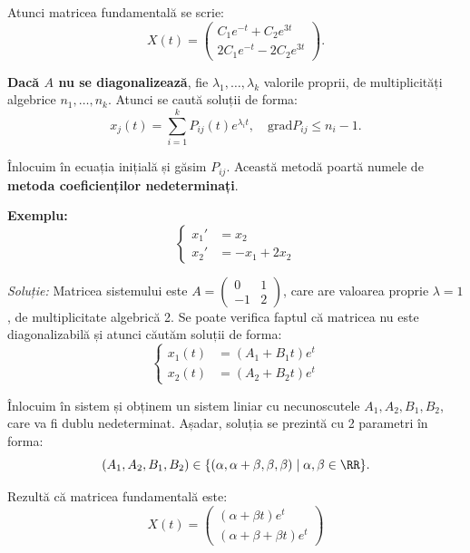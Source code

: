 Atunci matricea fundamentală se scrie:
\[
  X(t) = \begin{pmatrix}
    C_1 e^{-t} + C_2 e^{3t} \\
    2C_1 e^{-t} - 2C_2 e^{3t}
  \end{pmatrix}.
\]

\vspace{0.5cm}

\textbf{Dacă $A$ nu se diagonalizează}, fie $\lambda_1, \dots, \lambda_k$ valorile proprii,
de multiplicități algebrice $n_1, \dots, n_k$. Atunci se caută soluții de forma:
\[
  x_j(t) = \sum_{i = 1}^k P_{ij}(t) e^{\lambda_i t}, \quad \mathrm{grad}P_{ij} \leq n_i - 1.
\]

Înlocuim în ecuația inițială și găsim $P_{ij}$. Această metodă poartă numele de
\textbf{metoda coeficienților nedeterminați}.

\vspace{0.5cm}

\textbf{Exemplu:}
\[
  \begin{cases}
    x_1' &= x_2 \\
    x_2' &= -x_1 + 2x_2
  \end{cases}
\]

\emph{Soluție:} Matricea sistemului este $A = \begin{pmatrix} 0 & 1 \\ -1 & 2 \end{pmatrix}$,
care are valoarea proprie $\lambda = 1$, de multiplicitate algebrică 2. Se poate verifica faptul
că matricea nu este diagonalizabilă și atunci căutăm soluții de forma:
\[
  \begin{cases}
    x_1(t) &= (A_1 + B_1 t) e^t \\
    x_2(t) &= (A_2 + B_2 t) e^t
  \end{cases}
\]

Înlocuim în sistem și obținem un sistem liniar cu necunoscutele $A_1, A_2, B_1, B_2$,
care va fi dublu nedeterminat. Așadar, soluția se prezintă cu 2 parametri în forma:
\[
  (A_1, A_2, B_1, B_2) \in \{ (\alpha, \alpha + \beta, \beta, \beta) \mid \alpha, \beta \in \RR \}.
\]

Rezultă că matricea fundamentală este:
\[
  X(t) = \begin{pmatrix}
    (\alpha + \beta t) e^t \\
    (\alpha + \beta + \beta t) e^t
  \end{pmatrix}
\]

\vspace{0.5cm}

